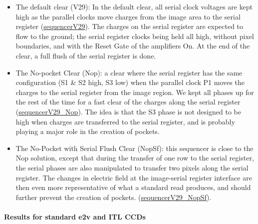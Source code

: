 \begin{itemize}
\tightlist
\item
  The default clear (V29): In the default clear, all serial clock voltages are
  kept high as the parallel clocks move charges from the image area to the
  serial register (\href{https://github.com/lsst-camera-dh/sequencer-files/blob/master/run7/FP_E2V_2s_l3cp_v29.seq}{sequencerV29}).
  The charges on the serial register are expected to flow to the ground;
  the serial register clocks being held all high, without pixel boundaries, and
  with the Reset Gate of the amplifiers On. At the end of the clear, a full
  flush of the serial register is done.
\item
  The No-pocket Clear (Nop): a clear where the serial register has the
  same configuration (S1 \& S2 high, S3 low) when the parallel clock P1
  moves the charges to the serial register from the image region. We kept all phases up for the rest of the time for a fast clear
  of the charges along the serial register
  (\href{https://github.com/lsst-camera-dh/sequencer-files/blob/master/run7/FP_E2V_2s_l3cp_v29_Nop.seq}{sequencerV29\_Nop}). The idea is
  that the S3 phase is not designed to be high when charges are transferred
  to the serial register, and is probably playing a major role in the creation of pockets.
\item
  The No-Pocket with Serial Flush Clear (NopSf): this sequencer is close
  to the Nop solution, except that during the transfer of one row to
  the serial register, the serial phases are also manipulated to transfer two
  pixels along the serial register. The changes in electric field at the
  image-serial register interface are then even more representative of
  what a standard read produces, and should further prevent the
  creation of pockets.
  (\href{https://github.com/lsst-camera-dh/sequencer-files/blob/master/run7/FP_E2V_2s_l3cp_v29_NopSf.seq}{sequencerV29\_NopSf}).
\end{itemize}


\paragraph{Results for standard e2v and ITL CCDs}\label{results-on-standard-e2v-and-itl-ccd}

